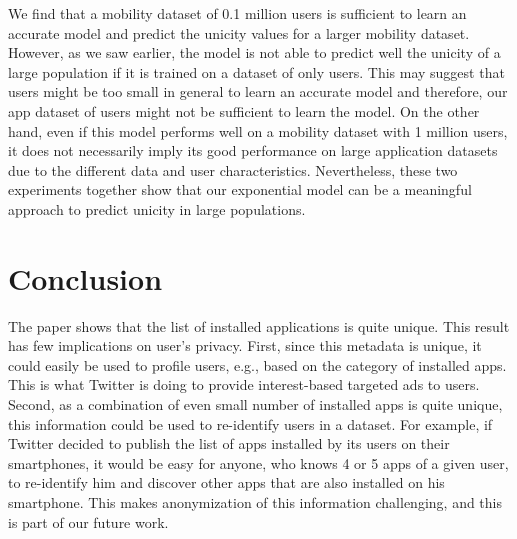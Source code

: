 \documentclass{acm_proc_article-sp}
\theoremstyle{plain}
\theoremstyle{plain}
\theoremstyle{plain}
\theoremstyle{plain}
\theoremstyle{plain}
\theoremstyle{plain}
\begin{document}
We find that a mobility dataset of 0.1 million users is sufficient to learn an accurate model and predict the unicity values for a larger mobility dataset.
However, as we saw earlier, the model is not able to predict well the unicity of a large population if it is trained on a dataset of only  users.
This may suggest that  users might be too small in general to learn an accurate model and therefore, our app dataset of  users might not be sufficient to learn the model.
On the other hand, even if this model performs well on a mobility dataset with 1 million users, it does not necessarily imply its good performance on large application datasets due to the different data and user characteristics.
Nevertheless, these two experiments together show that our exponential model can be a meaningful approach to predict unicity in large populations.






    










    





































\section{Conclusion}
The paper shows that the list of installed applications is quite unique.
This result has few implications on user's privacy. 
First, since this metadata is unique, it could easily be used to profile users, e.g., based on the category of installed apps. 
This is what Twitter is doing to provide interest-based targeted ads to users.
Second, as a combination of even small number of installed apps is quite unique, this information could be used to re-identify users in a dataset. 
For example, if Twitter decided to publish the list of apps installed by its users on their smartphones, it would be easy for anyone, who knows 4 or 5 apps of a given user, to re-identify him and discover other apps that are also installed on his smartphone. 
This makes anonymization of this information challenging, and this is part of our future work.
\end{document}
